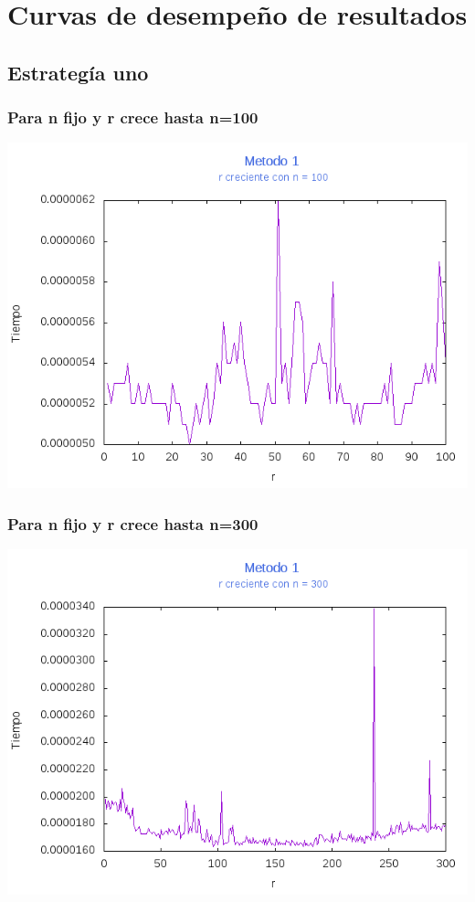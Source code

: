 \documentclass[12pt,letterpaper]{scrartcl}
\begin{document}
\newpage

\section{Curvas de desempeño de resultados}

\subsection{Estrategía uno}

\subsubsection{Para n fijo y r crece hasta n=100}
\includegraphics[scale=1]{Metodo1/plot100m1}

\subsubsection{Para n fijo y r crece hasta n=300}
\includegraphics[scale=1]{Metodo1/plot300m1}
\end{document}

